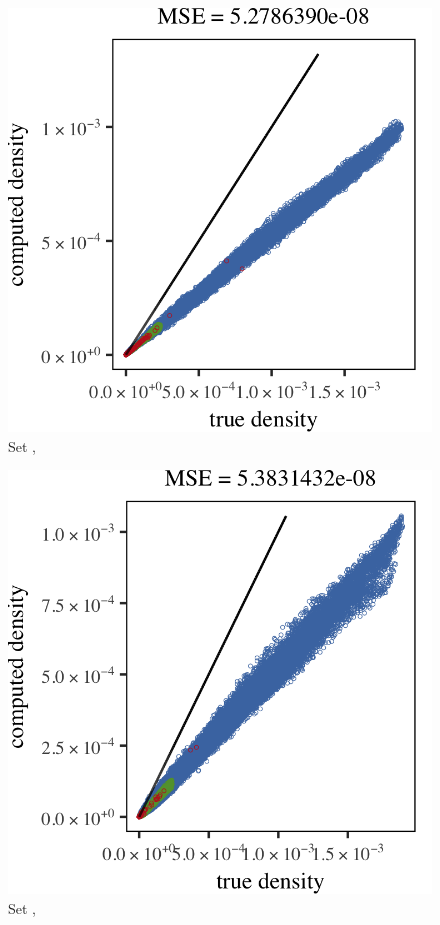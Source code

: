 
\begin{subfigure}{0.23\textwidth}
	\centering
	\includegraphics[keepaspectratio=true, width=\textwidth, height=0.23\textheight]{result/img/all/results_ferdosi_2_60000_mbe_silverman}
	\caption{Set \ferdosiTwo, \mbe}
	\label{fig:results:multisphere:mbe:ferdosi2}
\end{subfigure}
\begin{subfigure}{0.23\textwidth}
	\centering
	\includegraphics[keepaspectratio=true, width=\textwidth, height=0.23\textheight]{result/img/all/results_baakman_2_60000_mbe_silverman}
	\caption{Set \baakmanTwo, \mbe}
	\label{fig:results:multisphere:mbe:baakman2}
\end{subfigure}
